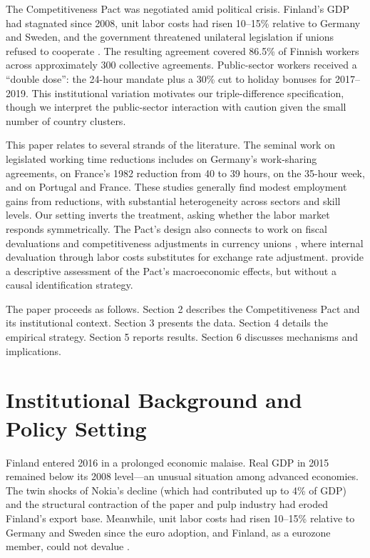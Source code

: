 \documentclass[12pt]{article}
\begin{document}
The Competitiveness Pact was negotiated amid political crisis. Finland's GDP had stagnated since 2008, unit labor costs had risen 10--15\% relative to Germany and Sweden, and the government threatened unilateral legislation if unions refused to cooperate \citep{oecd2018}. The resulting agreement covered 86.5\% of Finnish workers across approximately 300 collective agreements. Public-sector workers received a ``double dose'': the 24-hour mandate plus a 30\% cut to holiday bonuses for 2017--2019. This institutional variation motivates our triple-difference specification, though we interpret the public-sector interaction with caution given the small number of country clusters.

This paper relates to several strands of the literature. The seminal work on legislated working time reductions includes \citet{hunt1999} on Germany's work-sharing agreements, \citet{crepon2005} on France's 1982 reduction from 40 to 39 hours, \citet{estevao2008} on the 35-hour week, and \citet{lepinteur2019} on Portugal and France. These studies generally find modest employment gains from reductions, with substantial heterogeneity across sectors and skill levels. Our setting inverts the treatment, asking whether the labor market responds symmetrically. The Pact's design also connects to work on fiscal devaluations and competitiveness adjustments in currency unions \citep{blanchard2013}, where internal devaluation through labor costs substitutes for exchange rate adjustment. \citet{kauhanen2018} provide a descriptive assessment of the Pact's macroeconomic effects, but without a causal identification strategy.

The paper proceeds as follows. Section 2 describes the Competitiveness Pact and its institutional context. Section 3 presents the data. Section 4 details the empirical strategy. Section 5 reports results. Section 6 discusses mechanisms and implications.


\section{Institutional Background and Policy Setting}

Finland entered 2016 in a prolonged economic malaise. Real GDP in 2015 remained below its 2008 level---an unusual situation among advanced economies. The twin shocks of Nokia's decline (which had contributed up to 4\% of GDP) and the structural contraction of the paper and pulp industry had eroded Finland's export base. Meanwhile, unit labor costs had risen 10--15\% relative to Germany and Sweden since the euro adoption, and Finland, as a eurozone member, could not devalue \citep{oecd2018}.
\end{document}
